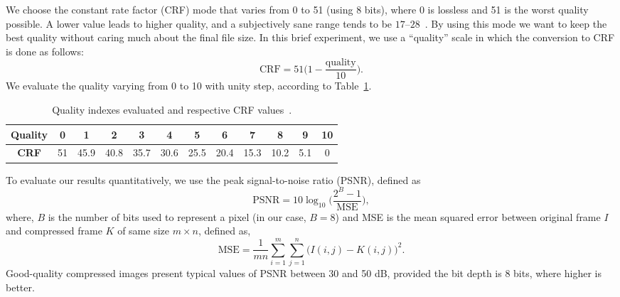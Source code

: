   We choose the constant rate factor (CRF)
  mode that varies from 0 to 51 (using 8 bits), where 0 is lossless and 51 is the worst quality possible.
  A lower value leads to higher quality, and a subjectively sane range tends to be $17$--$28$~\cite{web:ffmpeg}.
  By using this mode we want to keep the best quality without caring much about the final file size.
  In this brief experiment, we use a “quality” scale in which the conversion to CRF is done as follows:
  \begin{equation}
     \textrm{CRF} = 51\bigg(1 - \frac{\textrm{quality}}{10}\bigg).
    \end{equation}
  We evaluate the quality varying from 0 to 10 with unity step, according to Table~\ref{tab:crfxqual}.
%
\begin{table}[htb!]
\caption{Quality indexes evaluated and respective CRF values~\cite{web:ffmpeg}.}
\label{tab:crfxqual}
\centering
\begin{tabular}{@{}cccccccccccc@{}}
\toprule
\textbf{Quality} & 0  & 1    & 2    & 3    & 4    & 5    & 6    & 7    & 8    & 9   & 10 \\ \midrule
\textbf{CRF}     & 51 & 45.9 & 40.8 & 35.7 & 30.6 & 25.5 & 20.4 & 15.3 & 10.2 & 5.1 & 0  \\ \bottomrule
\end{tabular}
\end{table}

To evaluate our results quantitatively, we use the peak signal-to-noise ratio (PSNR), defined as
%
\begin{equation}
    \textrm{PSNR} = 10\log_{10}\bigg({\frac{2^B-1}{\textrm{MSE}}}\bigg),
    \label{eq:psnr}
\end{equation}
%
where, $B$ is the number of bits used to represent a pixel (in our case, $B=8$) and MSE is the mean squared error between original frame $I$ and compressed frame $K$ of same size $m\times n$, defined as,
%
\begin{equation}
    \textrm{MSE} = \frac{1}{mn} \sum_{i=1}^{m}\sum_{j=1}^{n} \bigg(I(i,j) - K(i,j) \bigg)^2.
    \label{eq:mse}
\end{equation}
%
%
Good-quality compressed images present typical values of PSNR between 30 and 50 dB, provided the bit depth is 8 bits, where higher is better.

